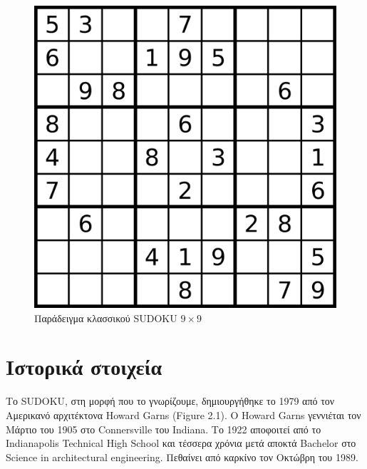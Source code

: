 \documentclass[12pt]{book}
\theoremstyle{definition}
\begin{document}
\begin{figure}[h]
	\centering
	\includegraphics[scale=0.2]{Figures/classicSUDOKU.jpeg}
	\caption{Παράδειγμα κλασσικού SUDOKU \( 9 \times 9\) }
\end{figure}

\chapter{Ιστορικά στοιχεία}

Το SUDOKU, στη μορφή που το γνωρίζουμε, δημιουργήθηκε το 1979 από τον Αμερικανό αρχιτέκτονα Howard Garns (Figure 2.1). O Howard Garns \cite{1} γεννιέται τον Μάρτιο του 1905 στο Connersville του Indiana. Το 1922 αποφοιτεί από το Indianapolis Technical High School και τέσσερα χρόνια μετά αποκτά Bachelor στο Science in architectural engineering. Πεθαίνει από καρκίνο τον Οκτώβρη του 1989.  \par
\end{document}
